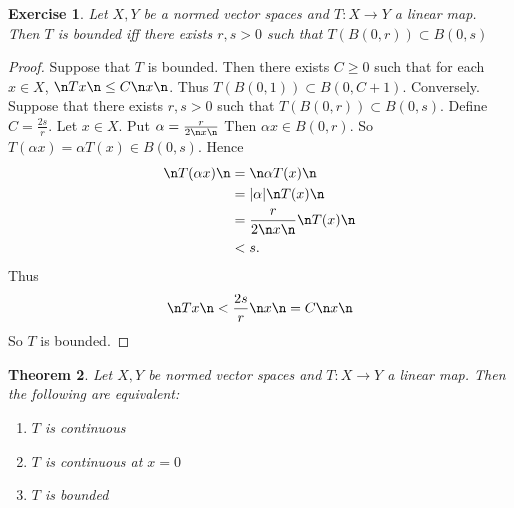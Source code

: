 \documentclass[12pt]{amsart}
\newtheorem{thm}{Theorem}[subsection]
\newtheorem{ex}[thm]{Exercise}
\newcommand{\al}{\alpha}
\begin{document}
\begin{ex}
	Let $X,Y$ be a normed vector spaces and $T:X \rightarrow Y$ a linear map. Then $T$ is bounded iff there exists $r,s>0$ such that $T(B(0,r)) \subset B(0,s)$
\end{ex}

\begin{proof}
	Suppose that $T$ is bounded. Then there exists $C \geq 0$ such that for each $x \in X$, $\n Tx \n \leq C \n x \n$. Thus $T(B(0,1)) \subset B(0,C+1)$. Conversely. Suppose that there exists $r,s >0$ such that $T(B(0,r)) \subset B(0,s)$. Define $C = \frac{2s}{r}$. Let $x \in X$. Put $\al = \frac{r}{2\n x \n}$ Then $\al x \in B(0,r)$. So $T(\al x ) = \al T(x) \in B(0,s)$. Hence 
	\begin{align*}
		\n T(\al x) \n 
		&= \n \al T(x) \n \\
		&= \vert \al \vert \n T(x) \n \\
		& = \frac{r}{2 \n x \n}  \n T(x) \n \\
		& < s.
	\end{align*}
	Thus $$\n Tx \n < \frac{2 s}{r} \n x \n = C \n x \n $$ So $T$ is bounded. 
\end{proof}

\begin{thm}
	Let $X,Y$ be normed vector spaces and $T:X \rightarrow Y$ a linear map. Then the following are equivalent:
	\begin{enumerate}
		\item $T$ is continuous
		\item $T$ is continuous at $x=0$
		\item $T$ is bounded
	\end{enumerate}
\end{thm}
\end{document}
